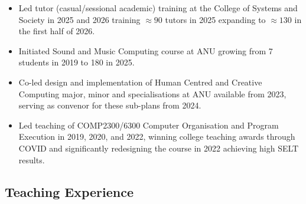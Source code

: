 \documentclass[11pt, a4paper, oneside]{article}
\begin{document}
\begin{itemize}

  \item Led tutor (casual/sessional academic) training at the College of Systems and Society in 2025 and 2026 training $\approx 90$ tutors in 2025 expanding to $\approx 130$ in the first half of 2026.

  \item Initiated Sound and Music Computing course at ANU growing from 7 students in 2019 to 180 in 2025.
  
  \item Co-led design and implementation of Human Centred and Creative Computing major, minor and specialisations at ANU available from 2023, serving as convenor for these sub-plans from 2024.

  \item Led teaching of COMP2300/6300 Computer Organisation and Program Execution in 2019, 2020, and 2022, winning college teaching awards through COVID and significantly redesigning the course in 2022 achieving high SELT results.

\end{itemize}

\subsection{Teaching Experience}
\label{teachingexperience}
\end{document}

